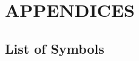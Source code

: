 
\appendix

\chapter*{APPENDICES}\label{chap:A}
\renewcommand{\thechapter}{A}
\setcounter{section}{0}
\renewcommand{\thesection}{\thechapter.\arabic{section}}
\setcounter{equation}{0}
\renewcommand{\theequation}{\thechapter.\arabic{equation}}
\setcounter{figure}{0}
\setcounter{table}{0}
\renewcommand{\thetable}{\thechapter.\arabic{table}}

\section{List of Symbols}\label{sec:A_1}

